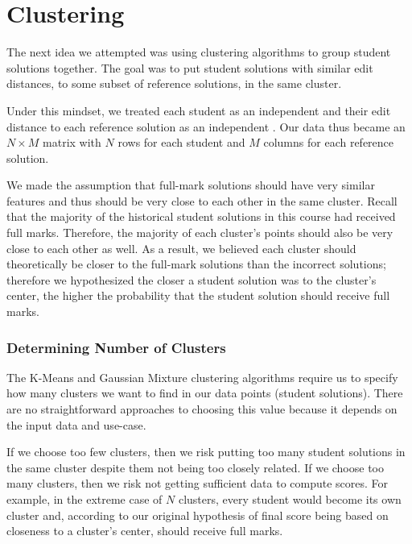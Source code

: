 \section{Clustering}
\label{sec:ctm-clustering}

The next idea we attempted was using clustering algorithms to group student solutions together. The goal was to put student solutions with similar edit distances, to some subset of reference solutions, in the same cluster.

Under this mindset, we treated each student as an independent  and their edit distance to each reference solution as an independent . Our data thus became an $N \times M$ matrix with $N$ rows for each student and $M$ columns for each reference solution.

We made the assumption that full-mark solutions should have very similar features and thus should be very close to each other in the same cluster. Recall that the majority of the historical student solutions in this course had received full marks. Therefore, the majority of each cluster's points should also be very close to each other as well. As a result, we believed each cluster should theoretically be  closer to the full-mark solutions than the incorrect solutions; therefore we hypothesized the closer a student solution was to the cluster's center, the higher the probability that the student solution should receive full marks.

\subsubsection{Determining Number of Clusters}

The K-Means and Gaussian Mixture clustering algorithms require us to specify how many clusters we want to find in our data points (student solutions). There are no straightforward approaches to choosing this value because it depends on the input data and use-case.

If we choose too few clusters, then we risk putting too many student solutions in the same cluster despite them not being too closely related. If we choose too many clusters, then we risk not getting sufficient data to compute scores. For example, in the extreme case of $N$ clusters, every student would become its own cluster and, according to our original hypothesis of final score being based on closeness to a cluster's center, should receive full marks.

